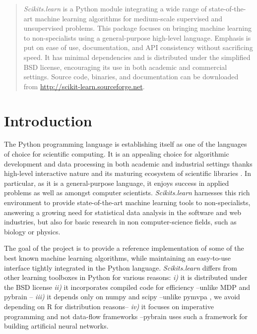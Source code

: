 \documentclass[twoside,11pt]{article}
\begin{document}
\maketitle

\begin{abstract} 
%
\emph{Scikits.learn} is a Python module integrating a wide range of
state-of-the-art machine learning algorithms for medium-scale supervised
and unsupervised problems. This package focuses on bringing machine
learning to non-specialists using a general-purpose high-level language.
Emphasis is put on ease of use, documentation, and API consistency
without sacrificing speed.
%
It has minimal dependencies and is distributed under the simplified BSD
license, encouraging its use in both academic and commercial settings.
Source code, binaries, and documentation can be downloaded from
\url{http://scikit-learn.sourceforge.net}.

\end{abstract}





\section{Introduction}

The Python programming language is establishing itself as one of the
languages of choice for scientific computing. It is an appealing choice 
for algorithmic development and data processing in both academic and 
industrial settings thanks high-level interactive
nature and its maturing ecosystem of scientific libraries
\citep{cise2007,cise2011}.
In particular, as it is a general-purpose language, it enjoys success in
applied problems as well as amongst computer scientists.
%
{\sl Scikits.learn} harnesses this rich environment to provide
state-of-the-art machine learning tools to non-specialists, answering a
growing need for statistical data analysis in the software and web
industries, but also for basic research in non computer-science fields,
such as biology or physics.

The goal of the project is to provide a reference implementation of some
of the best known machine learning algorithms, while maintaining an
easy-to-use interface tightly integrated in the Python language.
\emph{Scikits.learn} differs from other learning toolboxes in Python for
various reasons: \emph{i)} it is distributed under the BSD license
\emph{ii)} it incorporates compiled code for efficiency --unlike MDP
\citep{zito2008} and pybrain \citep{schaul2010}-- \emph{iii)} it depends
only on numpy and scipy --unlike pymvpa \citep{hanke2009}, we avoid depending
on R for distribution reasons-- \emph{iv)} it focuses on imperative
programming and not data-flow frameworks --pybrain uses such a framework
for building artificial neural networks.
\end{document}
